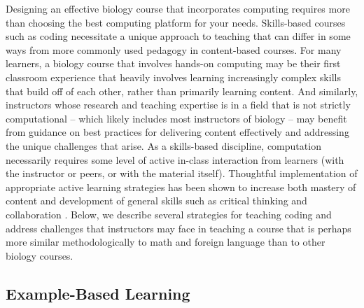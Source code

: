 Designing an effective biology course that incorporates computing requires more than choosing the best computing platform for your needs. Skills-based courses such as coding necessitate a unique approach to teaching that can differ in some ways from more commonly used pedagogy in content-based courses. 
For many learners, a biology course that involves hands-on computing may be their first classroom experience that heavily involves learning increasingly complex skills that build off of each other, rather than primarily learning content. And similarly, instructors whose research and teaching expertise is in a field that is not strictly computational -- which likely includes most instructors of biology -- may benefit from guidance on best practices for delivering content effectively and addressing the unique challenges that arise. As a skills-based discipline, computation 
necessarily requires some level of active in-class interaction from learners (with the instructor or peers, or with the material itself). Thoughtful implementation of appropriate active learning strategies has been shown to increase both mastery of content and development of general skills such as critical thinking and collaboration \citep{faust_paulson_1998}. Below, we describe several strategies for teaching coding and address challenges that instructors may face in teaching a course that is perhaps more similar methodologically to math and foreign language than to other biology courses.

\subsection{Example-Based Learning}

